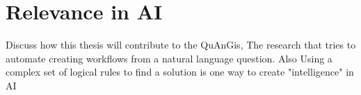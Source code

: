 \documentclass{article}
\begin{document}



\section{Relevance in AI}

Discuss how this thesis will contribute to the QuAnGis, The research that tries to automate creating workflows from a natural language question. 
Also Using a complex set of logical rules to find a solution is one way to create "intelligence" in AI 








\end{document}
